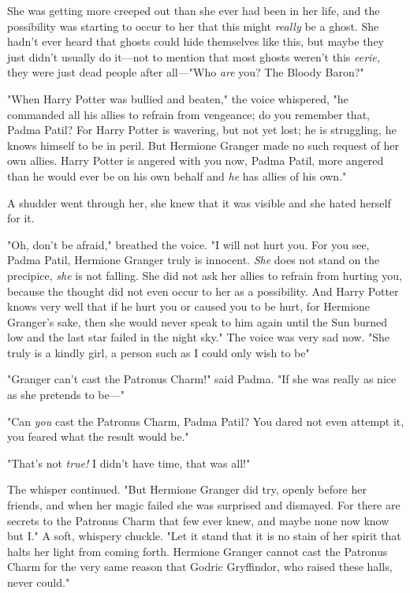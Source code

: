 She was getting more creeped out than she ever had been in her life, and the
possibility was starting to occur to her that this might \emph{really} be a
ghost. She hadn't ever heard that ghosts could hide themselves like this, but
maybe they just didn't usually do it—not to mention that most ghosts weren't
this \emph{eerie,} they were just dead people after all—"Who \emph{are} you?
The Bloody Baron?"

"When Harry Potter was bullied and beaten," the voice whispered, "he commanded
all his allies to refrain from vengeance; do you remember that, Padma Patil?
For Harry Potter is wavering, but not yet lost; he is struggling, he knows
himself to be in peril. But Hermione Granger made no such request of her own
allies. Harry Potter is angered with you now, Padma Patil, more angered than he
would ever be on his own behalf{\el} and \emph{he} has allies of his own."

A shudder went through her, she knew that it was visible and she hated herself
for it.

"Oh, don't be afraid," breathed the voice. "I will not hurt you. For you see,
Padma Patil, Hermione Granger truly is innocent. \emph{She} does not stand on
the precipice, \emph{she} is not falling. She did not ask her allies to refrain
from hurting you, because the thought did not even occur to her as a
possibility. And Harry Potter knows very well that if he hurt you or caused you
to be hurt, for Hermione Granger's sake, then she would never speak to him
again until the Sun burned low and the last star failed in the night sky." The
voice was very sad now. "She truly is a kindly girl, a person such as I could
only wish to be{\el}"

"Granger can't cast the Patronus Charm!" said Padma. "If she was really as nice
as she pretends to be—"

"Can \emph{you} cast the Patronus Charm, Padma Patil? You dared not even
attempt it, you feared what the result would be."

"That's not \emph{true!} I didn't have time, that was all!"

The whisper continued. "But Hermione Granger did try, openly before her
friends, and when her magic failed she was surprised and dismayed. For there
are secrets to the Patronus Charm that few ever knew, and maybe none now know
but I." A soft, whispery chuckle. "Let it stand that it is no stain of her
spirit that halts her light from coming forth. Hermione Granger cannot cast the
Patronus Charm for the very same reason that Godric Gryffindor, who raised
these halls, never could."

